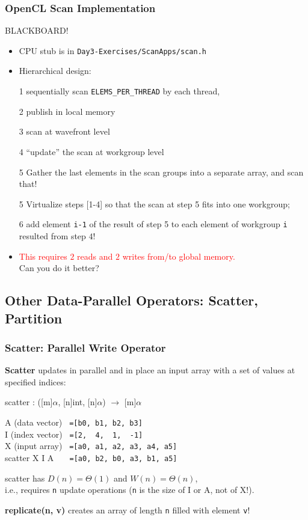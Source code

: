 \documentclass{beamer}
\newcommand{\red}[1]{\textcolor{Red}{{#1}}}
\renewcommand{\emph}[1]{\textcolor{CosGreen}{ #1}}
\newcommand{\emp}[1]{\textcolor{DikuRed}{ #1}}
\newcommand{\emphh}[1]{\textcolor{CosGreen}{ #1}}
\begin{document}
\begin{frame}[fragile,t]
  \frametitle{OpenCL Scan Implementation}

    BLACKBOARD!

\begin{itemize}
    \item CPU stub is in {\tt Day3-Exercises/ScanApps/scan.h}
    \item Hierarchical design:
    \item[1] sequentially scan {\tt ELEMS\_PER\_THREAD} by each thread,
    \item[2] publish in local memory
    \item[3] scan at wavefront level
    \item[4] ``update'' the scan at workgroup level
    \item[5] Gather the last elements in the scan groups into
             a separate array, and scan that!
    \item[5] Virtualize steps [1-4] so that the scan at step 5 fits
             into one workgroup;
    \item[6] add element {\tt i-1} of the result of step 5 
                to each element of workgroup {\tt i} resulted from step $4$!
    \item \red{This requires $2$ reads and $2$ writes from/to global memory.}\\
          \emphh{Can you do it better?}
\end{itemize}

\end{frame}

\subsection{Other Data-Parallel Operators: Scatter, Partition}

\begin{frame}[fragile,t]
  \frametitle{Scatter: Parallel Write Operator}

{\bf Scatter} \emph{updates in parallel and in place} an input array with a set of values at specified indices:
\smallskip

\emph{scatter : ([m]$\alpha$, [n]int, [n]$\alpha$) $\rightarrow$ [m]$\alpha$}
\bigskip

A (data vector)    {\tt~=[b0, b1, b2, b3]}\\
I (index vector)   {\tt~=[2,~~4,~~1,~~-1]}\\
X (input array)    {\tt~=[a0,~a1,~a2,~a3,~a4,~a5]}\\
\emp{scatter X I A {\tt~~~=[a0,~b2,~b0,~a3,~b1,~a5]}}
\bigskip\pause

\emph{scatter} has $D(n)=\Theta(1)$ and $W(n)=\Theta(n)$,\\
i.e., requires {\tt n} update operations ({\tt n} is the size of I or A, not of X!).\bigskip
\bigskip

{\bf replicate(n, v)} creates an array of length {\tt n} filled with element {\tt v}!

\end{frame}
\end{document}
